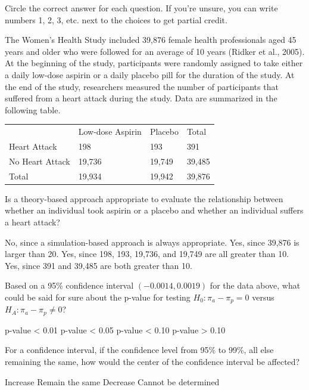 \documentclass{article}
\begin{document}
	Circle the correct answer for each question.  If you're unsure, you can write numbers 1, 2, 3, etc. next to the choices to get partial credit.\\[.5cm]
	
	\begin{mcquestions}
		\begin{mcquestioninstruction}
			The Women's Health Study included 39,876 female health professionals aged 45 years and older who were followed for an average of 10 years (Ridker et al., 2005). At the beginning of the study, participants were randomly assigned to take either a daily low-dose aspirin or a daily placebo pill for the duration of the study. At the end of the study, researchers measured the number of participants that suffered from a heart attack during the study. Data are summarized in the following table.
			\begin{tabular}{llll}
								& Low-dose Aspirin	& Placebo	& Total\\
				Heart Attack	& 198				&	193		&	391\\
				No Heart Attack	& 19,736			&	19,749	& 39,485\\
				Total			&	19,934			&	19,942	& 39,876
			\end{tabular}
		\end{mcquestioninstruction}
		
		\question Is a theory-based approach appropriate to evaluate the relationship between whether an individual took aspirin or a placebo and whether an individual suffers a heart attack?
		\begin{mcanswerslist}
			\answer No, since a simulation-based approach is always appropriate.
			\answer Yes, since 39,876 is larger than 20.
			\answer[correct] Yes, since 198, 193, 19,736, and 19,749 are all greater than 10.
			\answer Yes, since 391 and 39,485 are both greater than 10.
		\end{mcanswerslist}
		
		\question[follow] Based on a 95\% confidence interval $(-0.0014, 0.0019)$ for the data above, what could be said for sure about the p-value for testing
		$H_0 : \pi_a - \pi_p = 0$ versus $H_A : \pi_a - \pi_p \neq 0$?
		\begin{mcanswerslist}
			\answer p-value < 0.01
			\answer[correct] p-value < 0.05
			\answer p-value < 0.10
			\answer p-value > 0.10
		\end{mcanswerslist}
		
		\question For a confidence interval, if the confidence level from 95\% to 99\%, all else remaining the same, how would the center of the confidence interval be affected?
		\begin{mcanswerslist}
			\answer Increase
			\answer[correct] Remain the same
			\answer Decrease
			\answer Cannot be determined
		\end{mcanswerslist}
		

\end{mcquestions}
\end{document}
